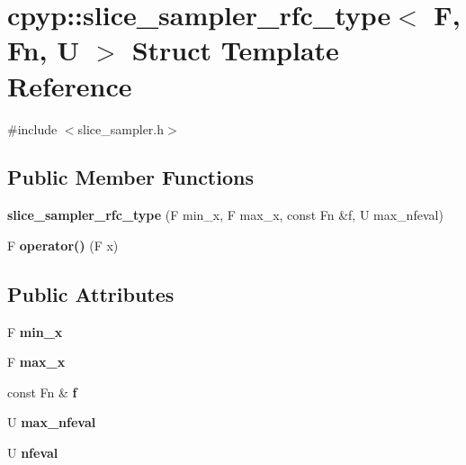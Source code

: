 \hypertarget{structcpyp_1_1slice__sampler__rfc__type}{}\section{cpyp\+:\+:slice\+\_\+sampler\+\_\+rfc\+\_\+type$<$ F, Fn, U $>$ Struct Template Reference}
\label{structcpyp_1_1slice__sampler__rfc__type}


{\ttfamily \#include $<$slice\+\_\+sampler.\+h$>$}

\subsection*{Public Member Functions}
\begin{DoxyCompactItemize}
\item 
\mbox{\label{structcpyp_1_1slice__sampler__rfc__type_a43fcfa551213dd6e02faf509bbd89e33}} 
{\bfseries slice\+\_\+sampler\+\_\+rfc\+\_\+type} (F min\+\_\+x, F max\+\_\+x, const Fn \&f, U max\+\_\+nfeval)
\item 
\mbox{\label{structcpyp_1_1slice__sampler__rfc__type_abe2d56d33ffd7f5f3be0574d03d1476d}} 
F {\bfseries operator()} (F x)
\end{DoxyCompactItemize}
\subsection*{Public Attributes}
\begin{DoxyCompactItemize}
\item 
\mbox{\label{structcpyp_1_1slice__sampler__rfc__type_a87dd40e39f8943d42d24b84e4cc9cbc8}} 
F {\bfseries min\+\_\+x}
\item 
\mbox{\label{structcpyp_1_1slice__sampler__rfc__type_a9d07fe96711633270344e3db812ea983}} 
F {\bfseries max\+\_\+x}
\item 
\mbox{\label{structcpyp_1_1slice__sampler__rfc__type_a7a3ec759a7d29ad6789d40f758ad840c}} 
const Fn \& {\bfseries f}
\item 
\mbox{\label{structcpyp_1_1slice__sampler__rfc__type_aaaff851896cee8d50b09cca1fbd50a5a}} 
U {\bfseries max\+\_\+nfeval}
\item 
\mbox{\label{structcpyp_1_1slice__sampler__rfc__type_aee717877f7e0f43491a2396971c384c8}} 
U {\bfseries nfeval}
\end{DoxyCompactItemize}


